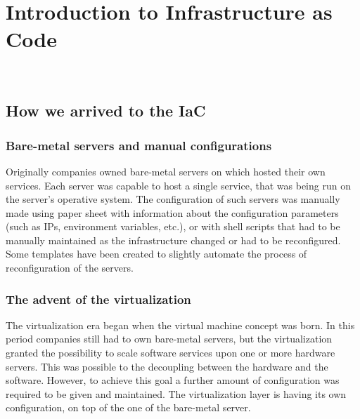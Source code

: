 
\chapter{Introduction to Infrastructure as Code}
\label{cap:introduction-to-iac}

\\



\section{How we arrived to the IaC}
\label{sec:story-iac}

\subsection{Bare-metal servers and manual configurations}
Originally companies owned bare-metal servers on which hosted their own services.
Each server was capable to host a single service, that was being run on the server's operative system.
The configuration of such servers was manually made using paper sheet with information about the configuration parameters (such as IPs, environment variables, etc.), or with shell scripts that had to be manually maintained as the infrastructure changed or had to be reconfigured.
Some templates have been created to slightly automate the process of reconfiguration of the servers.\\

\subsection{The advent of the virtualization}
The virtualization era began when the virtual machine concept was born.
In this period companies still had to own bare-metal servers, but the virtualization granted the possibility to scale software services upon one or more hardware servers.
This was possible to the decoupling between the hardware and the software.
However, to achieve this goal a further amount of configuration was required to be given and maintained.
The virtualization layer is having its own configuration, on top of the one of the bare-metal server.\\

